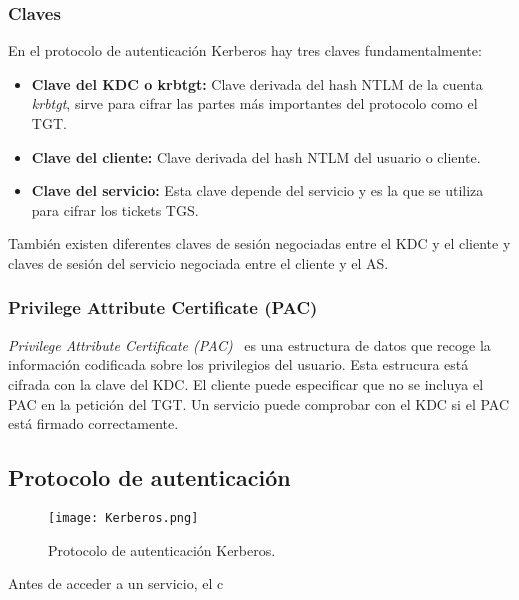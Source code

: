 \subsubsection{Claves}

En el protocolo de autenticación Kerberos hay tres claves fundamentalmente: 
\begin{itemize}
\item \textbf{Clave del KDC o krbtgt:} Clave derivada del hash NTLM de la cuenta {\it krbtgt}, sirve para cifrar las partes más importantes del protocolo como el TGT.
\item \textbf{Clave del cliente: } Clave derivada del hash NTLM del usuario o cliente. 
\item \textbf{Clave del servicio: } Esta clave depende del servicio y es la que se utiliza para cifrar los tickets TGS. 
\end{itemize}

También existen diferentes claves de sesión negociadas entre el KDC y el cliente y claves de sesión del servicio negociada entre el cliente y el AS. 

\subsubsection{Privilege Attribute Certificate (PAC)}

{\it Privilege Attribute Certificate (PAC)}~\cite{Capitulo3:PAC} es una estructura de datos que recoge la información codificada sobre los privilegios del usuario. Esta estrucura está cifrada con la clave del KDC. El cliente puede especificar que no se incluya el PAC en la petición del TGT. Un servicio puede comprobar con el KDC si el PAC está firmado correctamente. 

\subsection{Protocolo de autenticación}


\begin{figure}[t!] %
\begin{center}
\texttt{[image: Kerberos.png]}
\end{center}
\caption{Protocolo de autenticación Kerberos.}
\label{Kerberos}
\end{figure}

\begin{Enumerate}
\item Antes de acceder a un servicio, el c
\end{Enumerate}

























